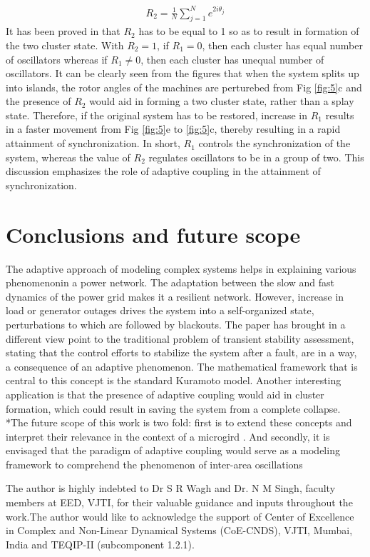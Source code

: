 \documentclass{ifacconf}
\begin{document}
\begin{align}
R_{2}= \frac{1}{N} \sum_{j=1}^{N} e^{2i \theta_{j}}
\end{align}
It has been proved in \citep{Kurths} that $R_{2}$ has to be equal to 1 so as to result in formation of the two cluster state. With  $R_{2}=1$, if  $R_{1}=0$, then each cluster has equal number of oscillators whereas if  $R_{1} \neq 0$, then each cluster has unequal number of oscillators. 
It can be clearly seen from the figures that when the system splits up into islands, the rotor angles of the machines are perturebed from Fig \ref{fig:5}c and the presence of $R_{2}$ would aid in forming a two cluster state, rather than a splay state. Therefore, if the original system has to be restored, increase in $R_{1}$ results in a faster movement from Fig \ref{fig:5}e to \ref{fig:5}c, thereby resulting in a rapid attainment of synchronization. In short, $R_{1}$ controls the synchronization of the system, whereas the value of $R_{2}$ regulates oscillators to be in a group of two. This discussion emphasizes the role of adaptive coupling in the attainment of synchronization.
\section{Conclusions and future scope}
The adaptive approach of modeling complex systems helps in explaining various phenomenonin a power network. 
The adaptation between the slow and fast dynamics of the power grid makes it a resilient network. However, increase in load or generator outages drives the system into a self-organized state, perturbations to which are followed by blackouts. The paper has brought in a different view point to the traditional problem of transient stability assessment, stating that the control efforts to stabilize the system after a fault, are in a way, a consequence of an adaptive phenomenon. The mathematical framework that is central to this concept is the standard Kuramoto model. Another interesting application is that the presence of adaptive coupling would aid in cluster formation, which could result in saving the system from a complete collapse. *The future scope of this work is two fold: first is to extend these concepts and interpret their relevance in the context of a microgird . And secondly, it is envisaged that the paradigm of adaptive coupling would serve as a modeling framework to comprehend the phenomenon of inter-area oscillations
\begin{ack}
The author is highly indebted to Dr S R Wagh and Dr. N M Singh, faculty members at EED, VJTI, for their valuable guidance and inputs throughout the work.The author would like to acknowledge the support of
Center of Excellence in Complex and Non-Linear Dynamical
Systems (CoE-CNDS), VJTI, Mumbai, India and TEQIP-II
(subcomponent 1.2.1).
\end{ack}

 \printnomenclature
 
\end{document}
